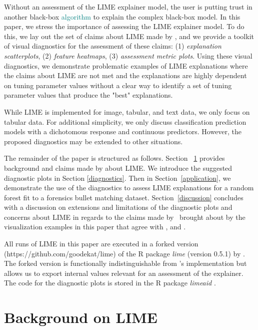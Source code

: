 \documentclass[AMS,STIX2COL]{WileyNJD-v2}\usepackage[]{graphicx}\usepackage[]{color}
\newcommand{\kge}[1]{\textcolor{teal}{#1}}
\renewcommand{\sout}[1]{\unskip}
\begin{document}
Without an assessment of the LIME explainer model, the user is putting trust in another black-box \kge{algorithm} \sout{procedure} to explain the complex black-box model. In this paper, we stress the importance of assessing the LIME explainer model. To do this, we lay out the set of claims about LIME made by \citet{ribeiro:2016}, and we provide a toolkit of visual diagnostics  for the assessment of these claims: (1) \emph{explanation scatterplots}, (2) \emph{feature heatmaps}, (3) \emph{assessment metric plots}. Using these visual diagnostics, we demonstrate problematic examples of LIME explanations where the claims about LIME are not met and the explanations are highly dependent on tuning parameter values without a clear way to identify a set of tuning parameter values that produce the "best" explanations.

While LIME is implemented for image, tabular, and text data, we only focus on tabular data. For additional simplicity, we only discuss classification prediction models with a dichotomous response  and continuous predictors. However, the proposed diagnostics may be extended to other situations.

The remainder of the paper is structured as follows. Section ~\ref{background} provides background and claims made by \citet{ribeiro:2016} about LIME. We introduce the suggested diagnostic plots in Section \ref{diagnostics}. Then in Section~\ref{application}, we demonstrate the use of the diagnostics to assess LIME explanations for a random forest fit to a forensics bullet matching dataset. Section~\ref{discussion} concludes with a discussion on extensions and limitations of the diagnostic plots and concerns about LIME in regards to the claims made by~\citet{ribeiro:2016} brought about by the visualization examples in this paper that agree with \citet{alvarezmelis:2018, laugel:2018}, and \citet{molnar:2019}.

All runs of LIME in this paper are executed in a forked version (https://github.com/goodekat/lime) of the R package \emph{lime} (version 0.5.1) by \citet{pedersen:2020}. The forked version is functionally indistinguishable from \citeauthor{pedersen:2020}'s implementation but allows us to export internal values relevant for an assessment of the explainer. The code for the diagnostic plots is stored in the R package \emph{limeaid} \citep{goode:2020}.

\section{Background on LIME} \label{background}
\end{document}
